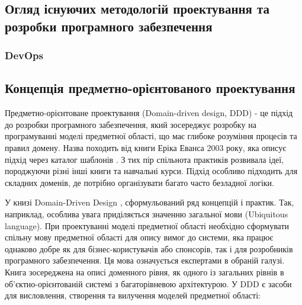 \subsection{Огляд існуючих методологій проектування та розробки програмного забезпечення}

\subsubsection{DevOps}


\subsection{Концепція предметно-орієнтованого проектування}

Предметно-орієнтоване проектування (Domain-driven design, DDD) 
- це підхід до розробки програмного забезпечення, 
який зосереджує розробку на програмуванні моделі предметної області,
що має глибоке розуміння процесів та правил домену.
Назва походить від книги Еріка Еванса 2003 року,
яка описує підхід через каталог шаблонів \cite{ddd-evans}.
З тих пір спільнота практиків розвивала ідеї,
породжуючи різні інші книги та навчальні курси.
Підхід особливо підходить для складних доменів,
де потрібно організувати багато часто безладної логіки.

У книзі Domain-Driven Design \cite{ddd-evans}, сформульований ряд концепцій і практик.
Так, наприклад, особлива увага приділяється значенню загальної мови (Ubiquitous language).
При проектуванні моделі предметної області необхідно сформувати спільну мову
предметної області для опису вимог до системи, яка працює однаково добре
як для бізнес-користувачів або спонсорів, так і для розробників програмного забезпечення.
Ця мова означується експертами в обраній галузі. Книга зосереджена на описі доменного рівня,
як одного із загальних рівнів в об'єктно-орієнтованій системі з багаторівневою архітектурою.
У DDD є засоби для висловлення, створення та вилучення моделей предметної області:

